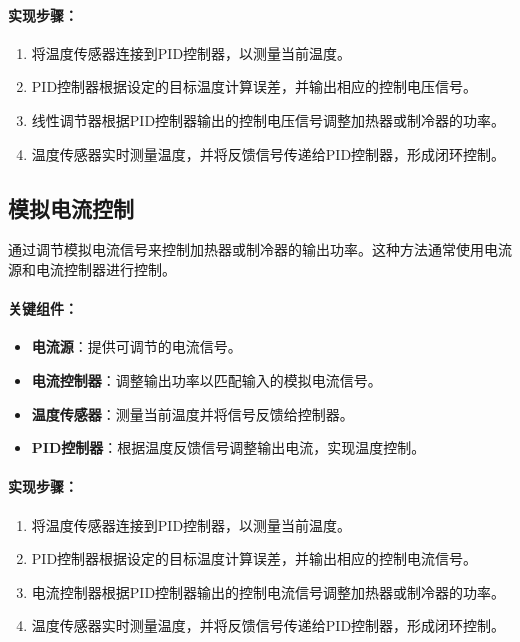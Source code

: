 \documentclass[dvipsnames, svgnames,a4paper,11pt]{article}
\begin{document}
\paragraph*{实现步骤：}
\begin{enumerate}
    \item 将温度传感器连接到PID控制器，以测量当前温度。
    \item PID控制器根据设定的目标温度计算误差，并输出相应的控制电压信号。
    \item 线性调节器根据PID控制器输出的控制电压信号调整加热器或制冷器的功率。
    \item 温度传感器实时测量温度，并将反馈信号传递给PID控制器，形成闭环控制。
\end{enumerate}

\subsection*{模拟电流控制}

通过调节模拟电流信号来控制加热器或制冷器的输出功率。这种方法通常使用电流源和电流控制器进行控制。

\paragraph*{关键组件：}
\begin{itemize}
    \item \textbf{电流源}：提供可调节的电流信号。
    \item \textbf{电流控制器}：调整输出功率以匹配输入的模拟电流信号。
    \item \textbf{温度传感器}：测量当前温度并将信号反馈给控制器。
    \item \textbf{PID控制器}：根据温度反馈信号调整输出电流，实现温度控制。
\end{itemize}

\paragraph*{实现步骤：}
\begin{enumerate}
    \item 将温度传感器连接到PID控制器，以测量当前温度。
    \item PID控制器根据设定的目标温度计算误差，并输出相应的控制电流信号。
    \item 电流控制器根据PID控制器输出的控制电流信号调整加热器或制冷器的功率。
    \item 温度传感器实时测量温度，并将反馈信号传递给PID控制器，形成闭环控制。
\end{enumerate}
\end{document}

